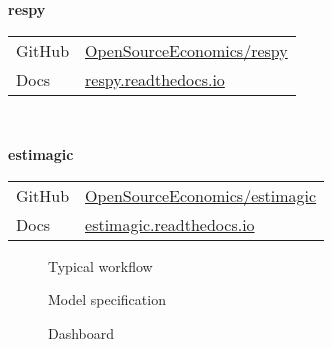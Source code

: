 \begin{frame}
\textbf{respy}\\\vspace{0.3cm}
\begin{tabular}{ll}
GitHub  & \url{OpenSourceEconomics/respy}\\
Docs    & \url{respy.readthedocs.io}\\
\end{tabular}\\\vspace{1cm}

\textbf{estimagic}\\\vspace{0.3cm}
\begin{tabular}{ll}
GitHub	& \url{OpenSourceEconomics/estimagic}\\
Docs    & \url{estimagic.readthedocs.io}\\
\end{tabular}

\end{frame}
\begin{frame}
  \begin{figure}\tiny
    \caption{Typical workflow}
         
   \end{figure}
\end{frame}
\begin{frame}

  \begin{figure}[h!]\centering
  \caption{Model specification}\label{Model specification}
  \hspace{0.3cm}
  \end{figure}

\end{frame}
\begin{frame}

  \begin{figure}[h!]\centering
  \caption{Dashboard}\label{Dashboard}
  \end{figure}

\end{frame}
